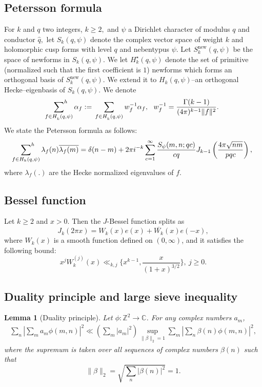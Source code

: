 \documentclass[12pt,a4paper,twoside, reqno]{amsart}
\newtheorem{lemma}{Lemma}
\begin{document}
\subsection{Petersson formula}
For $k$ and $q$ two integers, $k \geq 2,$ and $\psi$ a Dirichlet character of modulus $q$ and conductor $\hat{q},$ let $S_k(q, \psi)$ denote the complex vector space of weight $k $ and holomorphic cusp forms with level $q$ and nebentypus $\psi$. Let $S_k^{\mathrm{new}}(q, \psi)$ be the space of newforms in  $S_k(q, \psi).$  We let $ H_k^\star(q, \psi)$ denote the set
of primitive (normalized such that the first coefficient is  $1$) newforms    which forms an orthogonal basis of $S_k^{\mathrm{new}}(q, \psi)$. We  extend it to $H_k(q, \psi)$--an orthogonal Hecke--eigenbasis of $S_k(q, \psi)$. 
We denote
\[ \sideset{}{^h}\sum_{f \in H_k^{}(q,\psi)} \alpha_f:=  \sideset{}{}\sum_{f \in H_k^{}(q,\psi)} w_f^{-1}\alpha_f, \ \   w_f^{-1} = \frac{\Gamma(k-1)}{(4\pi)^{k-1} \| f\|^2}. \]
 We state the  Petersson formula as follows:
\begin{align}\label{petersson}
    \sideset{}{^h}{\sum}_{f \in H_k(q, \psi)}
 \lambda_f(n)\overline{\lambda_f(m)} 
=\delta(n-m) + 2 \pi i^{-k}
\sum_{c=1}^\infty  \frac{S_\psi(m,n;qc)}{cq} J_{k-1}\left( \frac{4\pi \sqrt{nm}}{pqc}\right),
\end{align}
where  $\lambda_f(.)$ are the Hecke normalized  eigenvalues  of  $f$.

 

\subsection{Bessel function}
Let $k \geq 2$ and $x>0$. Then the $J$-Bessel function splits as
\[J_k(2\pi x)=W_k(x)e(x)+\overline{W_k}(x)e(-x),\]
where $W_k(x)$  is a smooth function defined on $(0, \infty)$, and it satisfies the following bound:
\[x^jW_k^{(j)}(x)\ll_{k,j}  \{x^{k-1}, \frac{x}{(1+x)^{3/2} }\}, \ j \geq 0.  \]

\subsection{Duality principle and large sieve inequality}	
\begin{lemma}[Duality principle]\label{dualitylemma}
		Let $\phi: \mathbb{Z}^2\rightarrow \mathbb{C}$. For any complex numbers $a_m$, \begin{align*}
			\sum_n\left|\sum_m a_m\phi(m,n)\right|^2\ll \left( \sum_{ m} |a_m|^2\right)\sup_{\|\beta\|_2=1}\sum_m\left|\sum_n\beta(n)\phi(m,n)\right|^2,
		\end{align*}
		where the supremum is taken over all sequences of complex numbers $\beta(n)$ such that $$\|\beta\|_2=\sqrt{\sum_n|\beta(n)|^2}=1.$$
	\end{lemma}
\end{document}

